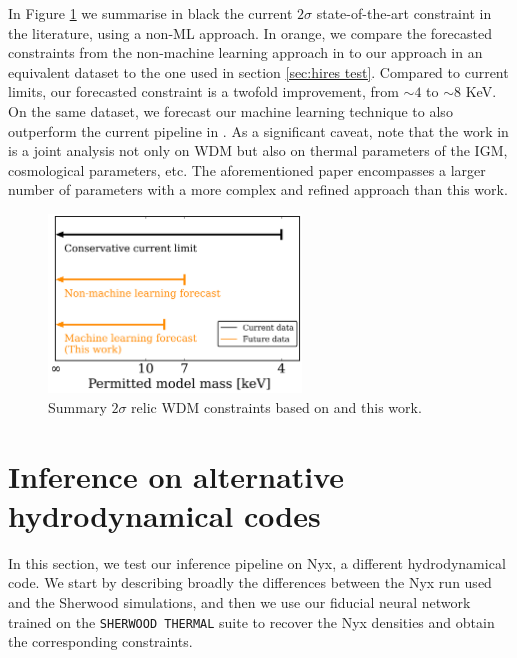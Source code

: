 In Figure \ref{fig: wdm constraints summary} we summarise in black the current $2\sigma$ state-of-the-art constraint in the literature, using a non-ML approach. In orange, we compare the forecasted constraints from the non-machine learning approach in \cite{sherwood_wdm} to our approach in an equivalent dataset to the one used in section \ref{sec:hires test}. Compared to current limits, our forecasted constraint is a twofold improvement, from $\sim 4$ to $\sim 8$ KeV. On the same dataset, we forecast our machine learning technique to also outperform the current pipeline in \cite{sherwood_wdm}. As a significant caveat, note that the work in \cite{sherwood_wdm} is a joint analysis not only on WDM but also on thermal parameters of the IGM, cosmological parameters, etc. The aforementioned paper encompasses a larger number of parameters with a more complex and refined approach than this work.


\begin{figure}
    \centering
    \includegraphics[width=0.6\textwidth]{img/ML/limits_summary.png}
    \caption{Summary $2\sigma$ relic WDM constraints based on \cite{sherwood_wdm} and this work.}
    \label{fig: wdm constraints summary}
\end{figure}













\section{Inference on alternative hydrodynamical codes}
In this section, we test our inference pipeline on Nyx, a different hydrodynamical code. We start by describing broadly the differences between the Nyx run used and the Sherwood simulations, and then we use our fiducial neural network trained on the \texttt{SHERWOOD THERMAL} suite to recover the Nyx densities and obtain the corresponding constraints.


